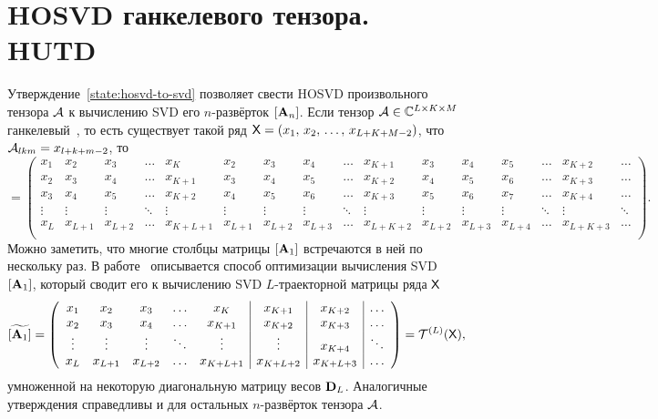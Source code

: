 \documentclass[specialist,
  substylefile = spbu.rtx,
subf,href,colorlinks=true, 12pt]{disser}
\theoremstyle{plain}
\theoremstyle{definition}
\theoremstyle{remark}
\def\newdecomp/{HUTD}
\begin{document}
\section{HOSVD ганкелевого тензора. \newdecomp/}\label{sec:newdecomp}
Утверждение~\ref{state:hosvd-to-svd} позволяет свести HOSVD
произвольного тензора $\mathcal{A}$ к вычислению SVD его $n$-развёрток $[\mathbf{A}_n]$.
Если тензор $\mathcal{A}\in\mathbb{C}^{L\times K \times M}$
ганкелевый~\cite{hankel-tensor}, то
есть существует такой ряд $\mathsf{X} = (x_1,\, x_2,\, \ldots,\, x_{L + K +
M - 2})$, что $\mathcal{A}_{lkm} = x_{l + k + m - 2}$, то
{
  \scriptsize{}\arraycolsep
  \begin{equation*}
    [\bfA_1] =
    \left(
      \begin{array}{ccccc|ccccc|ccccc|c}
        x_1 & x_2 & x_3 & \ldots & x_{K} & x_2 & x_3 & x_4 &
        \ldots & x_{K + 1} & x_3 & x_4 & x_5 &
        \ldots & x_{K + 2} & \ldots\\
        x_2 & x_3 & x_4 & \ldots & x_{K + 1} & x_3 & x_4 & x_5 &
        \ldots & x_{K + 2} & x_4 & x_5 & x_6 &
        \ldots & x_{K + 3} & \ldots\\
        x_3 & x_4 & x_5 & \ldots & x_{K + 2} & x_4 & x_5 & x_6 &
        \ldots & x_{K + 3} & x_5 & x_6 & x_7 &
        \ldots & x_{K + 4} & \ldots\\
        \vdots & \vdots&\vdots & \ddots& \vdots & \vdots& \vdots&
        \vdots&\ddots & \vdots& \vdots & \vdots&\vdots & \ddots&
        \vdots & \ddots\\
        x_L & x_{L + 1} & x_{L+2} & \ldots & x_{K + L + 1} &
        x_{L + 1} & x_{L+2} & x_{L + 3} & \ldots & x_{L + K + 2} &
        x_{L + 2} & x_{L+3} & x_{L + 4} & \ldots & x_{L + K + 3} & \ldots\\
      \end{array}
    \right).
  \end{equation*}
}Можно заметить, что многие столбцы матрицы $[\mathbf{A}_1]$ встречаются в
ней по нескольку раз.
В работе~\cite{Badeau2008} описывается способ оптимизации вычисления
SVD $[\mathbf{A}_1]$, который сводит его к вычислению SVD $L$-траекторной
матрицы ряда $\mathsf{X}$
\begin{equation}
  \label{eq:hankel_unfold_non_reduntant}
  \widetilde{[\mathbf{A}_1]} = \left(
    \begin{array}{ccccc|c|c|c}
      x_1 & x_2 & x_3 & \ldots & x_{K} & x_{K + 1} & x_{K + 2} & \ldots\\
      x_2 & x_3 & x_4 & \ldots & x_{K + 1} & x_{K + 2} & x_{K + 3} & \ldots\\
      \vdots & \vdots & \vdots & \ddots & \vdots & \vdots & x_{K +
      4} & \ddots\\
      x_L & x_{L + 1} & x_{L + 2} & \ldots & x_{K + L + 1} &
      x_{K + L + 2} & x_{K + L + 3} & \ldots\\
    \end{array}
  \right) = \mathcal{T}^{(L)}(\mathsf{X}),
\end{equation}
умноженной на некоторую диагональную матрицу весов $\mathbf{D}_L$.
Аналогичные утверждения справедливы и для остальных $n$-развёрток
тензора $\mathcal{A}$.
\end{document}
